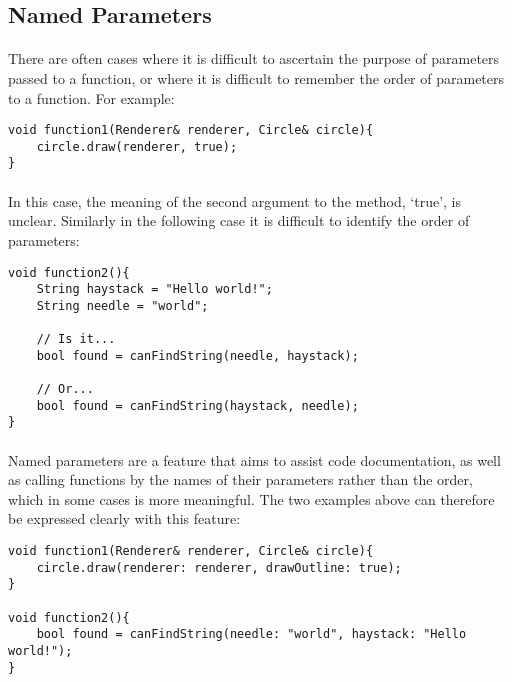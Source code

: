 \documentclass[12pt,twoside,notitlepage]{report}
\begin{document}
\clearpage

\subsection{Named Parameters}

\paragraph{}
There are often cases where it is difficult to ascertain the purpose of parameters passed to a function, or where it is difficult to remember the order of parameters to a function. For example:


\begin{lstlisting}
void function1(Renderer& renderer, Circle& circle){
	circle.draw(renderer, true);
}
\end{lstlisting}


\paragraph{}
In this case, the meaning of the second argument to the method, `true', is unclear. Similarly in the following case it is difficult to identify the order of parameters:


\begin{lstlisting}
void function2(){
	String haystack = "Hello world!";
	String needle = "world";
	
	// Is it...
	bool found = canFindString(needle, haystack);
	
	// Or...
	bool found = canFindString(haystack, needle);
}
\end{lstlisting}


\paragraph{}
Named parameters are a feature that aims to assist code documentation, as well as calling functions by the names of their parameters rather than the order, which in some cases is more meaningful. The two examples above can therefore be expressed clearly with this feature:


\begin{lstlisting}
void function1(Renderer& renderer, Circle& circle){
	circle.draw(renderer: renderer, drawOutline: true);
}

void function2(){
	bool found = canFindString(needle: "world", haystack: "Hello world!");
}
\end{lstlisting}
\end{document}
